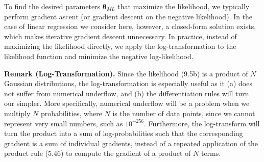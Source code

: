 \documentclass[12pt,openany]{book}
\theoremstyle{definition}
\begin{document}
	To find the desired parameters $\boldsymbol{\theta}_{ML}$ that maximize the likelihood, we typically perform gradient ascent (or gradient descent on the negative likelihood). In the case of linear regression we consider here, however, a closed-form solution exists, which makes iterative gradient descent unnecessary. In practice, instead of maximizing the likelihood directly, we apply the log-transformation to the likelihood function and minimize the negative log-likelihood.
	
	\textbf{Remark (Log-Transformation).} Since the likelihood (9.5b) is a product of $N$ Gaussian distributions, the log-transformation is especially useful as it (a) does not suffer from numerical underflow, and (b) the differentiation rules will turn our simpler. More specifically, numerical underflow will be a problem when we multiply $N$ probabilities, where $N$ is the number of data points, since we cannot represent very small numbers, such as $10^{-256}$. Furthermore, the log-transform will turn the product into a sum of log-probabilities such that the corresponding gradient is a sum of individual gradients, instead of a repeated application of the product rule (5.46) to compute the gradient of a product of $N$ terms.
	
\end{document}
